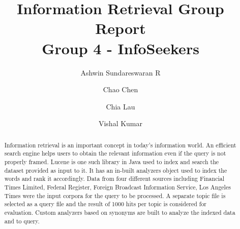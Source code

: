 \documentclass[sigconf]{acmart}
\begin{document}
\title{Information Retrieval Group Report\\Group 4 - InfoSeekers}

\author{Ashwin Sundareswaran R}

\author{Chao Chen}

\author{Chia Lau}

\author{Vishal Kumar}

\renewcommand{\shortauthors}{Group 4 - InfoSeekers}

\begin{abstract}
  Information retrieval is an important concept in today’s information world. An efficient search engine helps users to obtain the relevant information even if the query is not properly framed. Lucene is one such library in Java used to index and search the dataset provided as input to it. It has an in-built analyzers object used to index the words and rank it accordingly. Data from four different sources including Financial Times Limited, Federal Register, Foreign Broadcast Information Service, Los Angeles Times were the input corpora for the query to be processed. A separate topic file is selected as a query file and the result of 1000 hits per topic is considered for evaluation. Custom analyzers based on synonyms are built to analyze the indexed data and to query.
\end{abstract}
\end{document}
